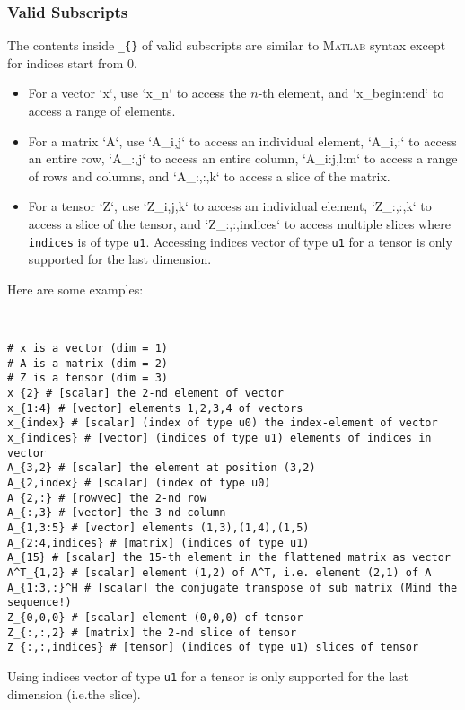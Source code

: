 \subsubsection{Valid Subscripts}
The contents inside \verb`_{}` of valid subscripts are similar
to \textsc{Matlab} syntax except for indices start from 0.
\begin{itemize}
  \item For a vector \ALG`x`, use \ALG`x_{n}` to access the $n$-th element,
    and \ALG`x_{begin:end}` to access a range of elements.
  \item For a matrix \ALG`A`, use \ALG`A_{i,j}` to access an individual element,
    \ALG`A_{i,:}` to access an entire row, \ALG`A_{:,j}` to access an entire column,
    \ALG`A_{i:j,l:m}` to access a range of rows and columns, and \ALG`A_{:,:,k}` to access a slice of the matrix.
  \item For a tensor \ALG`Z`, use \ALG`Z_{i,j,k}` to access an individual element,
    \ALG`Z_{:,:,k}` to access a slice of the tensor, and \ALG`Z_{:,:,indices}` to access multiple slices where \texttt{indices} is of type \texttt{u1}.
    Accessing indices vector of type \texttt{u1} for a tensor is only supported for the last dimension.
\end{itemize}
Here are some examples:
\begin{example}~
  \begin{lstlisting}[language=mmcesim-sim]
# x is a vector (dim = 1)
# A is a matrix (dim = 2)
# Z is a tensor (dim = 3)
x_{2} # [scalar] the 2-nd element of vector
x_{1:4} # [vector] elements 1,2,3,4 of vectors
x_{index} # [scalar] (index of type u0) the index-element of vector
x_{indices} # [vector] (indices of type u1) elements of indices in vector
A_{3,2} # [scalar] the element at position (3,2)
A_{2,index} # [scalar] (index of type u0)
A_{2,:} # [rowvec] the 2-nd row
A_{:,3} # [vector] the 3-nd column
A_{1,3:5} # [vector] elements (1,3),(1,4),(1,5)
A_{2:4,indices} # [matrix] (indices of type u1)
A_{15} # [scalar] the 15-th element in the flattened matrix as vector
A^T_{1,2} # [scalar] element (1,2) of A^T, i.e. element (2,1) of A
A_{1:3,:}^H # [scalar] the conjugate transpose of sub matrix (Mind the sequence!)
Z_{0,0,0} # [scalar] element (0,0,0) of tensor
Z_{:,:,2} # [matrix] the 2-nd slice of tensor
Z_{:,:,indices} # [tensor] (indices of type u1) slices of tensor
  \end{lstlisting}
\end{example}
\begin{warning}
  Using indices vector of type \texttt{u1} for a tensor is only supported
  for the last dimension (i.e.\@ the slice).
\end{warning}

